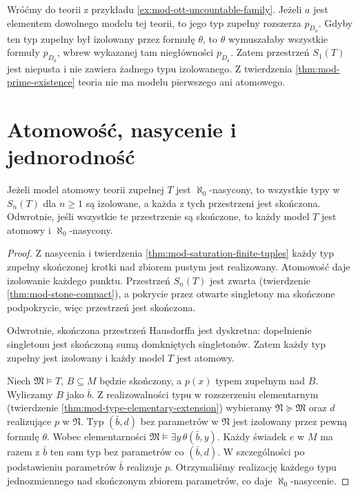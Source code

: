\begin{przyklad}
\label{ex:mod-no-prime}
Wróćmy do teorii z przykładu
\ref{ex:mod-ott-uncountable-family}.
Jeżeli $a$ jest elementem dowolnego modelu tej
teorii, to jego typ zupełny rozszerza $p_{D_a}$.
Gdyby ten typ zupełny był izolowany przez
formułę $\theta$, to $\theta$ wymuszałaby
wszystkie formuły $p_{D_a}$, wbrew wykazanej
tam niegłówności $p_{D_a}$.
Zatem przestrzeń $S_1(T)$ jest niepusta i nie
zawiera żadnego typu izolowanego. Z twierdzenia
\ref{thm:mod-prime-existence} teoria nie ma
modelu pierwszego ani atomowego.
\end{przyklad}

\section{Atomowość, nasycenie i jednorodność}

\begin{wniosek}
\label{cor:mod-atomic-saturated}
Jeżeli model atomowy teorii zupełnej $T$
jest $\aleph_0$-nasycony, to wszystkie typy
w $S_n(T)$ dla $n\geq1$ są izolowane,
a każda z tych przestrzeni jest skończona.
Odwrotnie, jeśli wszystkie te przestrzenie
są skończone, to każdy model $T$ jest atomowy
i $\aleph_0$-nasycony.
\end{wniosek}
\begin{proof}
Z nasycenia i twierdzenia
\ref{thm:mod-saturation-finite-tuples} każdy typ
zupełny skończonej krotki nad zbiorem pustym
jest realizowany. Atomowość daje izolowanie
każdego punktu. Przestrzeń $S_n(T)$ jest zwarta
(twierdzenie \ref{thm:mod-stone-compact}), a
pokrycie przez otwarte singletony ma skończone
podpokrycie, więc przestrzeń jest skończona.

Odwrotnie, skończona przestrzeń Hausdorffa
jest dyskretna: dopełnienie singletonu jest
skończoną sumą domkniętych singletonów.
Zatem każdy typ zupełny jest izolowany
i każdy model $T$ jest atomowy.

Niech $\mathfrak M\models T$, $B\subseteq M$
będzie skończony, a $p(x)$ typem zupełnym nad $B$.
Wyliczamy $B$ jako $\bar b$. Z realizowalności
typu w rozszerzeniu elementarnym
(twierdzenie \ref{thm:mod-type-elementary-extension})
wybieramy $\mathfrak N\succeq\mathfrak M$
oraz $d$ realizujące $p$ w $\mathfrak N$.
Typ $(\bar b,d)$ bez parametrów w $\mathfrak N$
jest izolowany przez pewną formułę $\theta$.
Wobec elementarności
$\mathfrak M\models\exists y\,\theta(\bar b,y)$.
Każdy świadek $e$ w $M$ ma razem z $\bar b$
ten sam typ bez parametrów co $(\bar b,d)$.
W szczególności po podstawieniu parametrów
$\bar b$ realizuje $p$. Otrzymaliśmy realizację
każdego typu jednozmiennego nad skończonym
zbiorem parametrów, co daje $\aleph_0$-nasycenie.
\end{proof}

